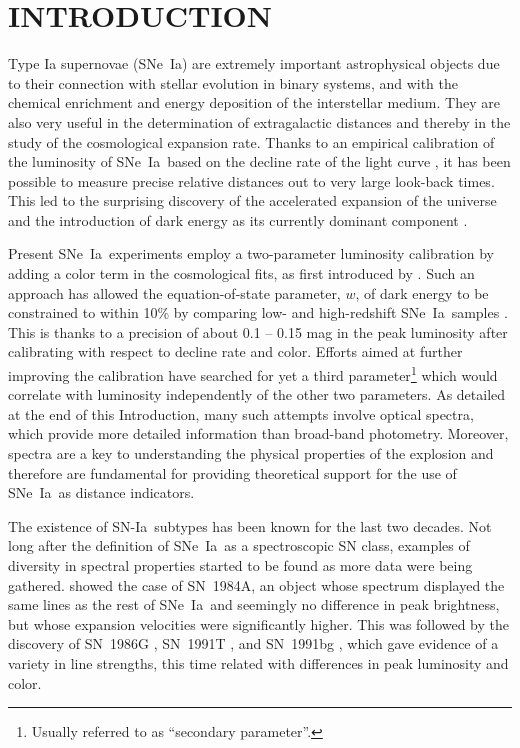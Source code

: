 \documentclass[apj]{emulateapj-rtx4}
\newcommand{\sndia}{SN-Ia}
\newcommand{\sneia}{SNe~Ia}
\begin{document}


\section{INTRODUCTION}
\label{sec:intro}

Type Ia supernovae (\sneia) are extremely important astrophysical
objects due to their connection with stellar evolution in binary
systems, and with the chemical enrichment and energy deposition of
the interstellar medium. They are also very useful in the
determination of extragalactic distances and thereby in the study of
the cosmological expansion rate. Thanks to an empirical calibration of
the luminosity of \sneia\ based on the decline rate of the light curve
\citep{phillips93}, it has been possible to measure precise relative
distances out to very large look-back times. This led to the
surprising discovery of the accelerated expansion of
the universe and the introduction of dark energy as its currently
dominant component \citep{riess98,perlmutter99}. 

Present \sneia\ experiments 
employ a two-parameter luminosity calibration by adding a color term
in the cosmological fits, as first introduced by \citet{tripp98}. Such
an approach has allowed the equation-of-state parameter,
$w$, of dark energy to be constrained to within 10\% by comparing
low- and high-redshift \sneia\ samples \citep[see,
  e.g.][]{riess07,freedman09,hicken09,amanullah10,sullivan11,suzuki12}. This
is thanks to a 
precision of about 0.1 -- 0.15 mag in the peak luminosity after
calibrating with respect to decline rate and color. 
Efforts aimed at further improving the calibration have searched for
yet a third parameter\footnote{Usually referred to as ``secondary
  parameter''.} which would correlate with luminosity independently of
the other two parameters. As detailed at the end of this
Introduction, many such attempts involve optical spectra,
which provide more detailed information than broad-band
photometry. Moreover, spectra are a key to understanding the
physical properties of the explosion and therefore are fundamental for
providing theoretical support for the use of \sneia\ as distance
indicators. 

The existence of \sndia\ subtypes has been known for the last two
decades. Not long after the definition of \sneia\ as a spectroscopic SN class,
examples of diversity in spectral properties started to be found as
more data were being gathered. \citet{branch87} showed the case of
SN~1984A, an object whose spectrum displayed the same lines as the
rest of \sneia\ and seemingly no difference in peak brightness, but
whose expansion velocities were significantly higher. This was followed by the
discovery of SN~1986G \citep{phillips87}, SN~1991T
\citep{filippenko92a,phillips92}, and SN~1991bg 
\citep{filippenko92b,leibundgut93}, which gave evidence of a variety in line 
strengths, this time related with differences in peak luminosity and
color. 
\end{document}
